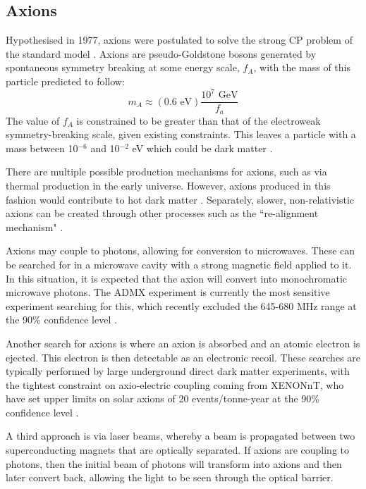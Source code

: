 \subsection{Axions}
\par
Hypothesised in 1977, axions were postulated to solve the strong CP problem of the standard model \cite{axion_origins_ref}.
Axions are pseudo-Goldstone bosons generated by spontaneous symmetry breaking at some energy scale, $f_A$, with the mass of this particle predicted to follow:
\begin{equation}
    m_A \approx (0.6 \text{ eV})\frac{10^7 \text{ GeV}}{f_a}
\end{equation}
The value of $f_A$ is constrained to be greater than that of the electroweak symmetry-breaking scale, given existing constraints.
This leaves a particle with a mass between 10${}^{-6}$ and 10${}^{-2}$ eV which could be dark matter \cite{axions_ref}.
\par
There are multiple possible production mechanisms for axions, such as via thermal production in the early universe.
However, axions produced in this fashion would contribute to hot dark matter \cite{hot_axions_ref}.
Separately, slower, non-relativistic axions can be created through other processes such as the ``re-alignment mechanism" \cite{cold_axion_ref}.
\par
Axions may couple to photons, allowing for conversion to microwaves.
These can be searched for in a microwave cavity with a strong magnetic field applied to it.
In this situation, it is expected that the axion will convert into monochromatic microwave photons.
The ADMX experiment is currently the most sensitive experiment searching for this, which recently excluded the 645-680 MHz range at the 90\% confidence level \cite{admx_experiment_ref}.
\par
Another search for axions is where an axion is absorbed and an atomic electron is ejected.
This electron is then detectable as an electronic recoil.
These searches are typically performed by large underground direct dark matter experiments, with the tightest constraint on axio-electric coupling coming from XENONnT, who have set upper limits on solar axions of 20 events/tonne-year at the 90\% confidence level \cite{xenonnt_sr1_er_ref}.
\par
A third approach is via laser beams, whereby a beam is propagated between two superconducting magnets that are optically separated.
If axions are coupling to photons, then the initial beam of photons will transform into axions and then later convert back, allowing the light to be seen through the optical barrier.
